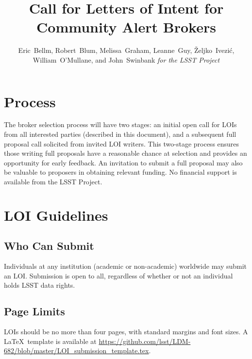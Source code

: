 \documentclass[DM,toc,lsstdraft]{lsstdoc}
\title{Call for Letters of Intent for Community Alert Brokers}
\author{
Eric~Bellm,
Robert~Blum,
Melissa~Graham,
Leanne~Guy,
\v{Z}eljko~Ivezi\'{c},
William~O'Mullane,
and John~Swinbank
\emph{for the LSST Project}
}
\begin{document}

\maketitle

\section{Process}

The broker selection process will have two stages:
an initial open call for LOIs from all interested parties (described in this document), and a subsequent full proposal call solicited from invited LOI writers.
This two-stage process ensures those writing full proposals have a reasonable chance at selection and provides an opportunity for early feedback.
An invitation to submit a full proposal may also be valuable to proposers in obtaining relevant funding.
No financial support is available from the LSST Project.


\section{LOI Guidelines}

\subsection{Who Can Submit}

Individuals at any institution (academic or non-academic) worldwide may submit an LOI.
Submission is open to all, regardless of whether or not an individual holds LSST data rights.


\subsection{Page Limits}

LOIs should be no more than four pages, with standard margins and font sizes.
A \LaTeX\ template is available at \url{https://github.com/lsst/LDM-682/blob/master/LOI_submission_template.tex}.
\end{document}
